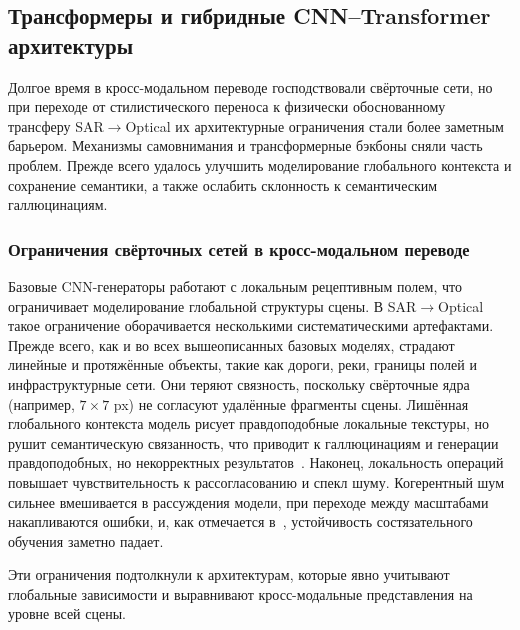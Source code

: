 \subsection{Трансформеры и гибридные CNN--Transformer архитектуры}
\label{subsec:transformers_sar2opt}

Долгое время в кросс-модальном переводе господствовали свёрточные сети, но при переходе от стилистического переноса к физически обоснованному трансферу SAR$\to$Optical их архитектурные ограничения стали более заметным барьером.
Механизмы самовнимания и трансформерные бэкбоны сняли часть проблем.
Прежде всего удалось улучшить моделирование глобального контекста и сохранение семантики, а также ослабить склонность к семантическим галлюцинациям.

\subsubsection{Ограничения свёрточных сетей в кросс-модальном переводе}
Базовые CNN-генераторы работают с локальным рецептивным полем, что ограничивает моделирование глобальной структуры сцены.
В SAR$\to$Optical такое ограничение оборачивается несколькими систематическими артефактами.
Прежде всего, как и во всех вышеописанных базовых моделях, страдают линейные и протяжённые объекты, такие как дороги, реки, границы полей и инфраструктурные сети.
Они теряют связность, поскольку свёрточные ядра~\cite{wang2025generative, kong2022multi} (например, $7 \times 7$ px) не согласуют удалённые фрагменты сцены.
Лишённая глобального контекста модель рисует правдоподобные локальные текстуры, но рушит семантическую связанность, что приводит к галлюцинациям и генерации правдоподобных, но некорректных результатов~\cite{wang2025generative, luo2024contextual}.
Наконец, локальность операций повышает чувствительность к рассогласованию и спекл шуму.
Когерентный шум сильнее вмешивается в рассуждения модели, при переходе между масштабами накапливаются ошибки, и, как отмечается в~\cite{wei2023cfrwd, wang2025generative}, устойчивость состязательного обучения заметно падает.

Эти ограничения подтолкнули к архитектурам, которые явно учитывают глобальные зависимости и выравнивают кросс-модальные представления на уровне всей сцены.

